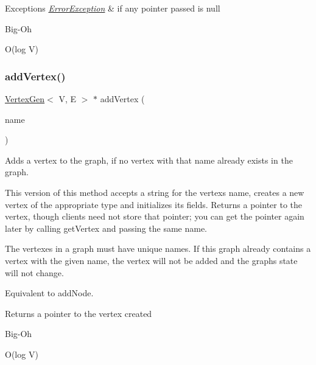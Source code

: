 \begin{DoxyExceptions}{Exceptions}
{\em \mbox{\hyperlink{classErrorException}{Error\+Exception}}} & if any pointer passed is null \\
\hline
\end{DoxyExceptions}
\begin{DoxyRefDesc}{Big-\/\+Oh}
\item[\mbox{\hyperlink{BigOh__BigOh000046}{Big-\/\+Oh}}]O(log V) \end{DoxyRefDesc}
\mbox{\label{classBasicGraphGen_a60f19882208c6d1dc51b74d5f348f458}} 
\subsubsection{\texorpdfstring{add\+Vertex()}{addVertex()}\hspace{0.1cm}{\footnotesize\ttfamily [1/2]}}
{\footnotesize\ttfamily \mbox{\hyperlink{classVertexGen}{Vertex\+Gen}}$<$ V, E $>$ $\ast$ add\+Vertex (\begin{DoxyParamCaption}\item[{const std\+::string \&}]{name }\end{DoxyParamCaption})}



Adds a vertex to the graph, if no vertex with that name already exists in the graph. 

This version of this method accepts a string for the vertex\textquotesingle{}s name, creates a new vertex of the appropriate type and initializes its fields. Returns a pointer to the vertex, though clients need not store that pointer; you can get the pointer again later by calling get\+Vertex and passing the same name.

The vertexes in a graph must have unique names. If this graph already contains a vertex with the given name, the vertex will not be added and the graph\textquotesingle{}s state will not change.

Equivalent to add\+Node.

\begin{DoxyReturn}{Returns}
a pointer to the vertex created 
\end{DoxyReturn}
\begin{DoxyRefDesc}{Big-\/\+Oh}
\item[\mbox{\hyperlink{BigOh__BigOh000006}{Big-\/\+Oh}}]O(log V) \end{DoxyRefDesc}
\mbox{\label{classBasicGraphGen_a99facea785e991d862eef401807c5f79}} 
